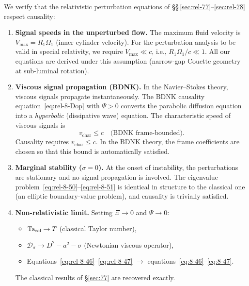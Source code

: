 
\begin{causalitycheck}
We verify that the relativistic perturbation equations of
\S\S\,\ref{sec:rel-77}--\ref{sec:rel-78} respect causality:

\begin{enumerate}
\item \textbf{Signal speeds in the unperturbed flow.}
  The maximum fluid velocity is $V_{\max} = R_1\Omega_1$ (inner
  cylinder velocity).  For the perturbation analysis to be valid in
  special relativity, we require $V_{\max} \ll c$, i.e., $R_1\Omega_1/c
  \ll 1$.  All our equations are derived under this assumption
  (narrow-gap Couette geometry at sub-luminal rotation).

\item \textbf{Viscous signal propagation (BDNK).}
  In the Navier--Stokes theory, viscous signals propagate
  instantaneously.  The BDNK causality
  equation~\eqref{eq:rel-8-Dop} with $\Psi > 0$ converts the
  parabolic diffusion equation into a \emph{hyperbolic} (dissipative wave)
  equation.  The characteristic speed of viscous signals is
  \begin{equation}
  \label{eq:rel-8-vvisc}
  v_{\mathrm{char}} \leqslant c
    \quad\text{(BDNK frame-bounded)}.
  \end{equation}
  Causality requires $v_{\mathrm{char}} \leqslant c$.  In the
  BDNK theory, the frame coefficients are chosen so that
  this bound is automatically satisfied.

\item \textbf{Marginal stability ($\sigma = 0$).}
  At the onset of instability, the perturbations are stationary and
  no signal propagation is involved.  The eigenvalue
  problem~\eqref{eq:rel-8-50}--\eqref{eq:rel-8-51} is identical in
  structure to the classical one (an elliptic boundary-value problem),
  and causality is trivially satisfied.

\item \textbf{Non-relativistic limit.}
  Setting $\Xi \to 0$ and $\Psi \to 0$:
  \begin{itemize}
  \item $\mathrm{Ta}_{\mathrm{rel}} \to T$ (classical Taylor number),
  \item $\mathcal{D}_\sigma \to D^2 - a^2 - \sigma$ (Newtonian
    viscous operator),
  \item Equations~\eqref{eq:rel-8-46}--\eqref{eq:rel-8-47}
    $\to$ equations~\eqref{eq:8-46}--\eqref{eq:8-47}.
  \end{itemize}
  The classical results of \S\ref{sec:77} are recovered exactly.
  \checkmark


\end{enumerate}
\end{causalitycheck}
